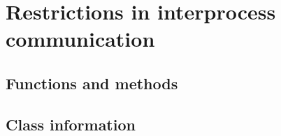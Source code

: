 \clearpage

\chapter{\textbf{Restrictions in interprocess communication}}\label{restrictions}

\section{Functions and methods}
\section{Class information}

